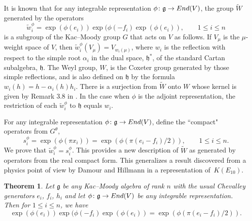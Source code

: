 \documentclass[11pt]{article}
\numberwithin{equation}{section}
\numberwithin{equation}{section}
\newtheorem{Theorem}{Theorem}[section]
\def\tW{{\widetilde{W}}}
\def\tw{{\widetilde{w}}}
\def\fg{\mathfrak{g}}
\def\fh{\mathfrak{h}}
\begin{document}
It is known \cite{Kac90} that for any integrable representation $\phi\colon \fg\to {\rm End}(V)$, the group $\tW$ generated by the operators
\[\tw_i^\phi = \exp(\phi(e_i)) \exp(\phi(-f_i) \exp(\phi(e_i)),\qquad 1\leq i\leq n\]
is a subgroup of the Kac--Moody group $G$ that acts on $V$ as follows. If $V_\mu$ is the $\mu$-weight space of $V$, then $\tw_i^\phi (V_\mu) = V_{w_i(\mu)}$, where $w_i$ is the reflection with respect to the simple root $\alpha_i$ in the dual space, $\fh^*$, of the standard Cartan subalgebra, $\fh$. The Weyl group, $W$, is the Coxeter group generated by those simple reflections, and is also defined on $\fh$ by the formula $w_i(h) = h - \alpha_i(h) h_i$. There is a surjection from $\tW$ onto $W$ whose kernel is given by Remark 3.8 in \cite{Kac90}. In the case when $\phi$ is the adjoint representation, the restriction of each $\tw_i^\phi$ to $\fh$ equals $w_i$.

For any integrable representation $\phi\colon \fg\to {\rm End}(V)$, define the ``compact" operators from $G^\theta$,
\[s_i^\phi = \exp(\phi(\pi x_i)) = \exp(\phi(\pi(e_i - f_i)/2)),\qquad 1\leq i\leq n.\]
We prove that $\tw_i^\phi = s_i^\phi$. This provides a new description of $\tW$ as generated by operators from the real compact form. This generalizes a result discovered from a physics point of view by Damour and Hillmann in a representation of~$K(E_{10})$.

\begin{Theorem}\label{theorem:newWeylFormula} Let $\fg$ be any Kac--Moody algebra of rank $n$ with the usual Chevalley generators $e_i$, $f_i$, $h_i$ and let $\phi\colon \fg\to {\rm End}(V)$ be any integrable representation. Then for $1\leq i\leq n$, we have
\[\exp(\phi(e_i)) \exp(\phi(-f_i) \exp(\phi(e_i)) = \exp(\phi(\pi(e_i - f_i)/2)).\]
\end{Theorem}
\end{document}
